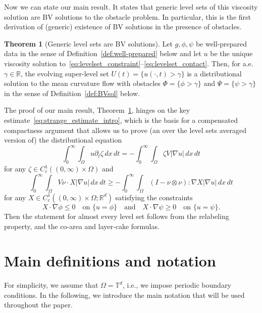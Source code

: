 \documentclass{amsart}
\theoremstyle{definition}
\newtheorem{theorem}[definition]{Theorem}
\def\R{{\mathbb{R}}}
\begin{document}
\medskip

Now we can state our main result. It states that generic level sets of this viscosity solution are BV solutions to the obstacle problem.
In particular, this is the first derivation of (generic) existence of BV solutions in the presence of obstacles. 


\begin{theorem}[Generic level sets are BV solutions]\label{thm:BVsol}
    Let $g, \phi, \psi$ be well-prepared data in the sense of Definition~\ref{def:well-prepared} below and let $u$ be the unique viscosity solution to~\eqref{eq:levelset_constraint}--\eqref{eq:levelset_contact}. 
    Then, for a.e.~$\gamma\in \R$, the evolving super-level set $U(t)=\{u(\cdot,t)>\gamma\}$ is a distributional solution to the mean curvature flow with obstacles $\Phi=\{\phi>\gamma\}$ and $\Psi = \{\psi>\gamma\}$ in the sense of Definition~\ref{def:BVsol} below.    
\end{theorem}


The proof of our main result, Theorem~\ref{thm:BVsol}, hinges on the key estimate~\eqref{eq:strange_estimate_intro}, which is the basis for a compensated compactness argument that allows us to prove (an over the level sets averaged version of) the distributional equation \[
    \int_0^\infty \int_\Omega u\partial_t \zeta \,dx\,dt= - \int_0^\infty \int_\Omega \zeta V |\nabla u| \,dx\,dt
\]
for any $\zeta\in C_c^1((0,\infty)\times \Omega)$ and
\[
    \int_0^\infty \int_\Omega  V \nu \cdot X |\nabla u| \,dx\,dt \geq -\int_0^\infty\int_\Omega (I-\nu \otimes \nu) \colon \nabla X|\nabla u| \,dx\,dt
\]
for any $X\in C_c^1((0,\infty)\times \Omega;\mathbb{R}^d)$  satisfying the constraints
\[
    X\cdot \nabla \phi \leq 0 \quad \text{on }\{u=\phi\}
    \quad \text{and} \quad 
    X\cdot \nabla \psi \geq 0 \quad \text{on }\{u=\psi\}.
\]
Then the statement for almost every level set follows from the relabeling property, and the co-area and layer-cake formulas.

\section{Main definitions and notation}
For simplicity, we assume that $\Omega =\mathbb{T}^d$, i.e., we impose periodic boundary conditions. 
In the following, we introduce the main notation that will be used throughout the paper.
\end{document}
